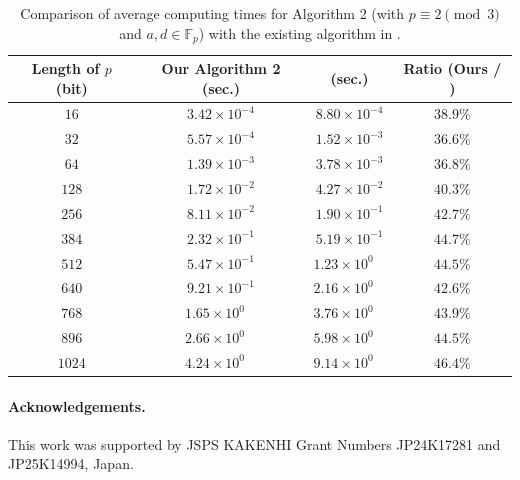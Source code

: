 \documentclass{article}
\theoremstyle{definition}
\newcommand{\FF}{\mathbb{F}}
\begin{document}
%
%
\begin{table}[t]
\centering
\caption{Comparison of average computing times for Algorithm 2 (with $p \equiv 2 \pmod{3}$ and $a,d \in \FF_p$) with the existing algorithm in \cite{DBLP:journals/ieiceta/HashimotoN23}.}
\label{tab:experiment_Fp_SS}
\begin{tabular}{c|c|c|c}
Length of $p$ (bit) & Our Algorithm 2 (sec.) & \cite{DBLP:journals/ieiceta/HashimotoN23} (sec.) & Ratio (Ours / \cite{DBLP:journals/ieiceta/HashimotoN23}) \\ \hline
$16$ & $3.42 \times 10^{-4}$ & $8.80 \times 10^{-4}$ & $38.9\%$ \\ \hline
$32$ & $5.57 \times 10^{-4}$ & $1.52 \times 10^{-3}$ & $36.6\%$ \\ \hline
$64$ & $1.39 \times 10^{-3}$ & $3.78 \times 10^{-3}$ & $36.8\%$ \\ \hline
$128$ & $1.72 \times 10^{-2}$ & $4.27 \times 10^{-2}$ & $40.3\%$ \\ \hline
$256$ & $8.11 \times 10^{-2}$ & $1.90 \times 10^{-1}$ & $42.7\%$ \\ \hline
$384$ & $2.32 \times 10^{-1}$ & $5.19 \times 10^{-1}$ & $44.7\%$ \\ \hline
$512$ & $5.47 \times 10^{-1}$ & $1.23 \times 10^{0\phantom{-}}$ & $44.5\%$ \\ \hline
$640$ & $9.21 \times 10^{-1}$ & $2.16 \times 10^{0\phantom{-}}$ & $42.6\%$ \\ \hline
$768$ & $1.65 \times 10^{0\phantom{-}}$ & $3.76 \times 10^{0\phantom{-}}$ & $43.9\%$ \\ \hline
$896$ & $2.66 \times 10^{0\phantom{-}}$ & $5.98 \times 10^{0\phantom{-}}$ & $44.5\%$ \\ \hline
$1024$ & $4.24 \times 10^{0\phantom{-}}$ & $9.14 \times 10^{0\phantom{-}}$ & $46.4\%$
\end{tabular}
\end{table}
%
%

\paragraph{Acknowledgements.}

This work was supported by JSPS KAKENHI Grant Numbers JP24K17281 and JP25K14994, Japan.




\end{document}
